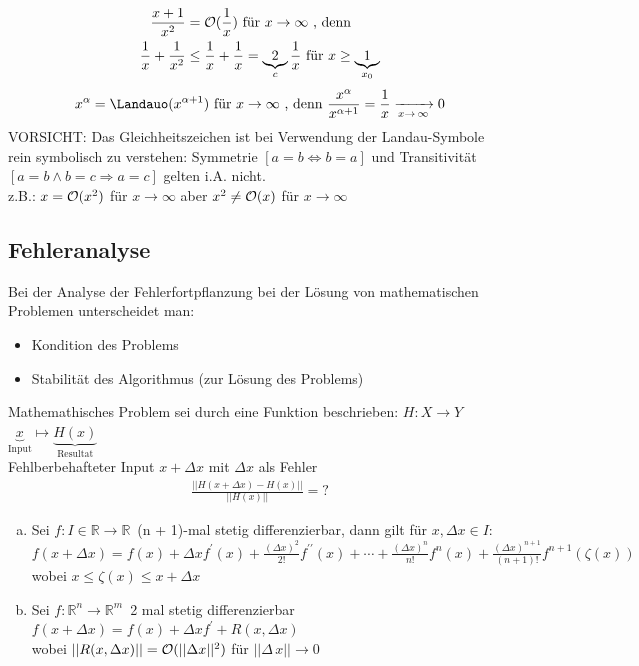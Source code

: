 \begin{align*}
  \frac{x + 1}{x^2} &= \mathcal{O}(\frac{1}{x}) \text{ für } x \to \infty \text{ , denn } \\
  \frac{1}{x} + \frac{1}{x^2} &\leq \frac{1}{x} + \frac{1}{x} = \underbrace{2}_c \frac{1}{x} \text{ für } x \geq \underbrace{1}_{x_0}
\end{align*}
\begin{align*}
  x^{\alpha} = \Landauo(x^{\alpha + 1}) \text{ für } x \to \infty \text{ , denn }
  \frac{x^{\alpha}}{x^{\alpha + 1}} = \frac{1}{x} \xrightarrow[x\to\,\infty]{}0
\end{align*}
\textcolor{rot}{VORSICHT}: Das Gleichheitszeichen ist bei Verwendung der Landau-Symbole rein symbolisch
zu verstehen: Symmetrie $[a = b \Leftrightarrow b = a]$ und Transitivität 
$[a = b \wedge b = c \Rightarrow a = c]$ gelten i.A. nicht. \\
z.B.: $x = \mathcal{O}(x^2)$ für $x \to \infty$ aber $x^2 \neq \mathcal{O}(x)$ für $x \to \infty$

\subsection{Fehleranalyse}
Bei der Analyse der Fehlerfortpflanzung bei der Lösung von mathematischen Problemen
unterscheidet man:
\begin{itemize}
  \item Kondition des Problems
  \item Stabilität des Algorithmus (zur Lösung des Problems)
\end{itemize}
Mathemathisches Problem sei durch eine Funktion beschrieben: $H:X \to Y$ \\ 
$\underbrace{x}_{\textrm{Input}} \mapsto \underbrace{H(x)}_{\textrm{Resultat}}$\\
Fehlberbehafteter Input $x + \Delta x$ mit $\Delta x$ als Fehler
\begin{align*}
  \frac{|| H(x + \Delta x) - H(x)||}{|| H(x) ||} = ?
\end{align*}
\begin{enumerate}[(a)]
  \item Sei $f: I \in \mathbb{R} \to \mathbb{R}\,$ (n + 1)-mal stetig differenzierbar, dann gilt für
    $x, \Delta x \in I$: \\
    $f(x + \Delta x) = f(x) + \Delta x f^{\prime}(x) + 
    \frac{(\Delta x)^2}{2!}f^{\prime\prime}(x) + \cdots + 
    \frac{(\Delta x)^n}{n!}f^n(x)+
    \frac{(\Delta x)^{n + 1}}{(n + 1)!}f^{n + 1}(\zeta(x)) $ \\
    wobei $x \leq \zeta(x)\leq x + \Delta x$
  \item Sei $f: \mathbb{R}^n \to \mathbb{R}^m\,$ 2 mal stetig differenzierbar \\
    $f(x + \Delta x) = f(x) + \Delta x f^{\prime} + R(x, \Delta x) $ \\
    wobei $||R(x, \Delta x)|| = \mathcal{O}(||\Delta x||^2)$ für $||\Delta\,x|| \to 0$
\end{enumerate}

